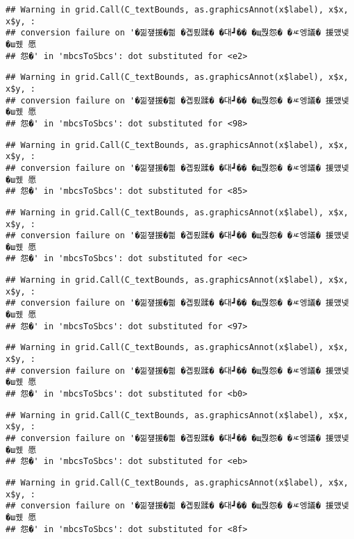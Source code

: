 \documentclass[
]{article}
\begin{document}
\begin{verbatim}
## Warning in grid.Call(C_textBounds, as.graphicsAnnot(x$label), x$x, x$y, :
## conversion failure on '�낆쟾援�쁾 �곕룄蹂� �대┛�� �щ쭩怨� �ㅼ엥議� 援먰넻�ш퀬 愿
## 怨�' in 'mbcsToSbcs': dot substituted for <e2>
\end{verbatim}

\begin{verbatim}
## Warning in grid.Call(C_textBounds, as.graphicsAnnot(x$label), x$x, x$y, :
## conversion failure on '�낆쟾援�쁾 �곕룄蹂� �대┛�� �щ쭩怨� �ㅼ엥議� 援먰넻�ш퀬 愿
## 怨�' in 'mbcsToSbcs': dot substituted for <98>
\end{verbatim}

\begin{verbatim}
## Warning in grid.Call(C_textBounds, as.graphicsAnnot(x$label), x$x, x$y, :
## conversion failure on '�낆쟾援�쁾 �곕룄蹂� �대┛�� �щ쭩怨� �ㅼ엥議� 援먰넻�ш퀬 愿
## 怨�' in 'mbcsToSbcs': dot substituted for <85>
\end{verbatim}

\begin{verbatim}
## Warning in grid.Call(C_textBounds, as.graphicsAnnot(x$label), x$x, x$y, :
## conversion failure on '�낆쟾援�쁾 �곕룄蹂� �대┛�� �щ쭩怨� �ㅼ엥議� 援먰넻�ш퀬 愿
## 怨�' in 'mbcsToSbcs': dot substituted for <ec>
\end{verbatim}

\begin{verbatim}
## Warning in grid.Call(C_textBounds, as.graphicsAnnot(x$label), x$x, x$y, :
## conversion failure on '�낆쟾援�쁾 �곕룄蹂� �대┛�� �щ쭩怨� �ㅼ엥議� 援먰넻�ш퀬 愿
## 怨�' in 'mbcsToSbcs': dot substituted for <97>
\end{verbatim}

\begin{verbatim}
## Warning in grid.Call(C_textBounds, as.graphicsAnnot(x$label), x$x, x$y, :
## conversion failure on '�낆쟾援�쁾 �곕룄蹂� �대┛�� �щ쭩怨� �ㅼ엥議� 援먰넻�ш퀬 愿
## 怨�' in 'mbcsToSbcs': dot substituted for <b0>
\end{verbatim}

\begin{verbatim}
## Warning in grid.Call(C_textBounds, as.graphicsAnnot(x$label), x$x, x$y, :
## conversion failure on '�낆쟾援�쁾 �곕룄蹂� �대┛�� �щ쭩怨� �ㅼ엥議� 援먰넻�ш퀬 愿
## 怨�' in 'mbcsToSbcs': dot substituted for <eb>
\end{verbatim}

\begin{verbatim}
## Warning in grid.Call(C_textBounds, as.graphicsAnnot(x$label), x$x, x$y, :
## conversion failure on '�낆쟾援�쁾 �곕룄蹂� �대┛�� �щ쭩怨� �ㅼ엥議� 援먰넻�ш퀬 愿
## 怨�' in 'mbcsToSbcs': dot substituted for <8f>
\end{verbatim}
\end{document}
